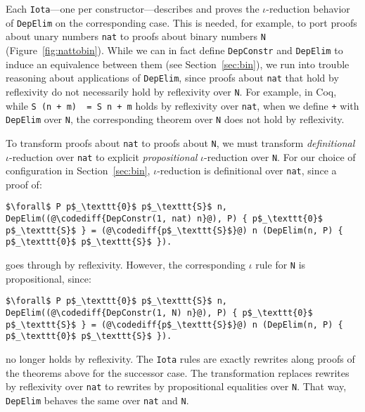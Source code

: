 Each \lstinline{Iota}---one per constructor---describes and proves the $\iota$-reduction behavior
of \lstinline{DepElim} on the corresponding case.
This is needed, for example, to port proofs about unary numbers \lstinline{nat} to
proofs about binary numbers \lstinline{N} (Figure~\ref{fig:nattobin}).
While we can in fact define \lstinline{DepConstr} and \lstinline{DepElim} to induce an equivalence
between them (see Section~\ref{sec:bin}), we run into trouble reasoning about applications of \lstinline{DepElim},
since proofs about \lstinline{nat} that hold by reflexivity do not necessarily hold by reflexivity over \lstinline{N}. 
For example, in Coq, while \lstinline{S (n + m)  = S n + m} holds by reflexivity over \lstinline{nat},
when we define \lstinline{+} with \lstinline{DepElim} over \lstinline{N},
the corresponding theorem over \lstinline{N} does not hold by reflexivity.

To transform proofs about \lstinline{nat} to proofs about \lstinline{N}, we must transform \textit{definitional} $\iota$-reduction over \lstinline{nat} to explicit \textit{propositional} $\iota$-reduction over \lstinline{N}.
For our choice of configuration in Section~\ref{sec:bin},
$\iota$-reduction is definitional over \lstinline{nat}, since a proof of:

\begin{lstlisting}
$\forall$ P p$_\texttt{0}$ p$_\texttt{S}$ n, DepElim((@\codediff{DepConstr(1, nat) n}@), P) { p$_\texttt{0}$ p$_\texttt{S}$ } = (@\codediff{p$_\texttt{S}$}@) n (DepElim(n, P) { p$_\texttt{0}$ p$_\texttt{S}$ }).
\end{lstlisting}
goes through by reflexivity.
However, the corresponding $\iota$ rule for \lstinline{N} is propositional, since:

\begin{lstlisting}
$\forall$ P p$_\texttt{0}$ p$_\texttt{S}$ n, DepElim((@\codediff{DepConstr(1, N) n}@), P) { p$_\texttt{0}$ p$_\texttt{S}$ } = (@\codediff{p$_\texttt{S}$}@) n (DepElim(n, P) { p$_\texttt{0}$ p$_\texttt{S}$ }).
\end{lstlisting}
no longer holds by reflexivity.
The \lstinline{Iota} rules are exactly rewrites along proofs of the theorems above for the successor case.
The transformation replaces rewrites by reflexivity over \lstinline{nat} to rewrites by propositional equalities over \lstinline{N}.
That way, \lstinline{DepElim} behaves the same over \lstinline{nat} and \lstinline{N}.

